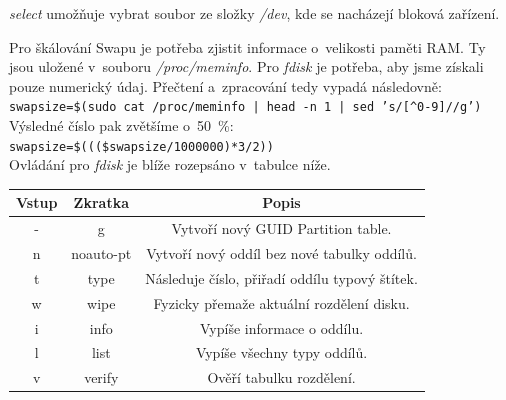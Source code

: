 \documentclass[12pt,a4paper,twoside,]{article}
\begin{document}
\hspace{-1.5em}\textit{select} umožňuje vybrat soubor ze složky \textit{/dev}, kde se nacházejí bloková zařízení.
\newpage
{Pro škálování Swapu je potřeba zjistit informace o~velikosti paměti RAM. Ty jsou uložené v~souboru \textit{/proc/meminfo}. Pro \textit{fdisk} je potřeba, aby jsme získali pouze numerický údaj. Přečtení a~zpracování tedy vypadá následovně:\\
	
\texttt{swapsize=\$(sudo cat /proc/meminfo | head -n 1 | sed 's/[\^{}0-9]//g')}\\

\hspace*{-1.5em}Výsledné číslo pak zvětšíme o~50~\%:\\ 

\texttt{swapsize=\$(((\$swapsize/1000000)*3/2))}\\

\hspace{-1.5em}Ovládání pro \textit{fdisk} je blíže rozepsáno v~tabulce níže.
\begin{table}[h]
	\begin{tabular}{|c|c|c|}\hline
		Vstup & Zkratka & Popis \\ \hline
		-&g&Vytvoří nový GUID Partition table. \\ \hline
		n&noauto-pt&Vytvoří nový oddíl bez nové tabulky oddílů. \\ \hline
		t&type&Následuje číslo, přiřadí oddílu typový štítek. \\ \hline
		w&wipe&Fyzicky přemaže aktuální rozdělení disku.
		\\ \hline
		i&info&Vypíše informace o oddílu. \\ \hline
		l&list&Vypíše všechny typy oddílů. \\ \hline
		v&verify&Ověří tabulku rozdělení. \\ \hline
		
	\end{tabular}
\end{table}




\newpage
}
\end{document}
